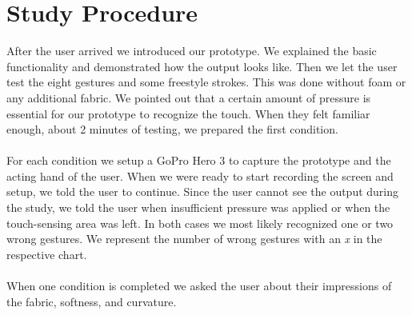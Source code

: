 \section{Study Procedure}
After the user arrived we introduced our prototype. We explained the basic functionality and demonstrated how the output looks like. Then we let the user test the eight gestures and some freestyle strokes. This was done without foam or any additional fabric. We pointed out that a certain amount of pressure is essential for our prototype to recognize the touch. When they felt familiar enough, about 2 minutes of testing, we prepared the first condition. 
\\ \\
For each condition we setup a GoPro Hero 3 to capture the prototype and the acting hand of the user. When we were ready to start recording the screen and setup, we told the user to continue. Since the user cannot see the output during the study, we told the user when insufficient  pressure was applied or when the touch-sensing area was left. In both cases we most likely recognized one or two wrong gestures. We represent the number of wrong gestures with an \emph{x} in the respective chart. 
\\ \\
When one condition is completed we asked the user about their impressions of the fabric, softness, and curvature. 

